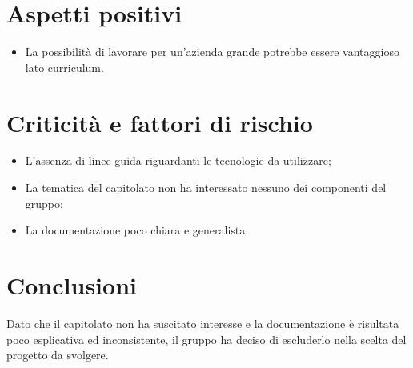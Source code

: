 \section{Aspetti positivi}
\begin{itemize}
	\item La possibilità di lavorare per un'azienda grande potrebbe essere vantaggioso lato curriculum.
\end{itemize}
\section{Criticità e fattori di rischio}
\begin{itemize}
	\item L'assenza di linee guida riguardanti le tecnologie da utilizzare;
	\item La tematica del capitolato non ha interessato nessuno dei componenti del gruppo;
	\item La documentazione poco chiara e generalista.
\end{itemize}
\section{Conclusioni}
Dato che il capitolato non ha suscitato interesse e la documentazione è risultata poco esplicativa ed inconsistente, il gruppo ha deciso di escluderlo nella scelta del progetto da svolgere.